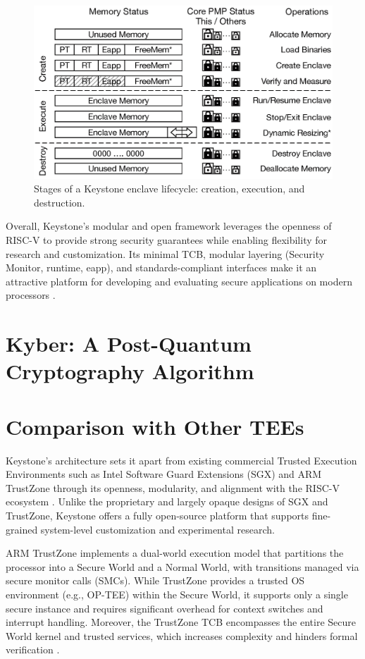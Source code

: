 \begin{figure}[htbp]
\centering
\includegraphics[width=0.9\linewidth]{figures/enclave_lifecycle.png}
\caption{Stages of a Keystone enclave lifecycle: creation, execution, and destruction.}
\label{fig:enclave_lifecycle}
\end{figure}

Overall, Keystone’s modular and open framework leverages the openness of RISC-V to provide strong security guarantees while enabling flexibility for research and customization. Its minimal TCB, modular layering (Security Monitor, runtime, eapp), and standards-compliant interfaces make it an attractive platform for developing and evaluating secure applications on modern processors \cite{dayeol2019keystone}.

\section{Kyber: A Post-Quantum Cryptography Algorithm}

\section{Comparison with Other TEEs}

Keystone’s architecture sets it apart from existing commercial Trusted Execution Environments such as Intel Software Guard Extensions (SGX) and ARM TrustZone through its openness, modularity, and alignment with the RISC-V ecosystem \cite{dayeol2019keystone}. Unlike the proprietary and largely opaque designs of SGX and TrustZone, Keystone offers a fully open-source platform that supports fine-grained system-level customization and experimental research.

ARM TrustZone implements a dual-world execution model that partitions the processor into a Secure World and a Normal World, with transitions managed via secure monitor calls (SMCs). While TrustZone provides a trusted OS environment (e.g., OP-TEE) within the Secure World, it supports only a single secure instance and requires significant overhead for context switches and interrupt handling. Moreover, the TrustZone TCB encompasses the entire Secure World kernel and trusted services, which increases complexity and hinders formal verification \cite{dayeol2019keystone}.

